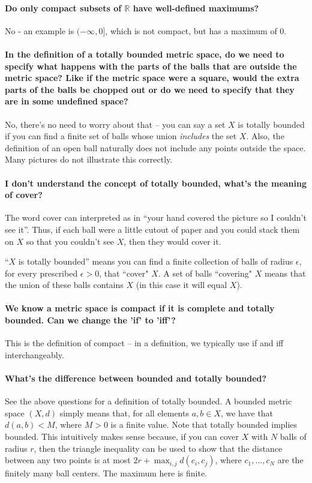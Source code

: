 \documentclass[10pt,english]{article}
\begin{document}
\paragraph{Do only compact subsets of $\mathbb{R}$ have well-defined maximums?}
No - an example is $(-\infty,0]$, which is not compact, but has a maximum of 0.


\paragraph{In the definition of a totally bounded metric space, do we need to specify what happens with the parts of the balls that are outside the metric space? Like if the metric space were a square, would the extra parts of the balls be chopped out or do we need to specify that they are in some undefined space?}

No, there's no need to worry about that -- you can say a set $X$ is totally bounded if you can find a finite set of balls whose union \textit{includes} the set $X$.
Also, the definition of an open ball naturally does not include any points outside the space.
Many pictures do not illustrate this correctly.


\paragraph{I don't understand the concept of totally bounded, what's the meaning of cover?}

The word cover can interpreted as in ``your hand covered the picture so I couldn't see it''.
Thus, if each ball were a little cutout of paper and you could stack them on $X$ so that you couldn't see $X$, then they would cover it.

``$X$ is totally bounded'' means you can find a finite collection of balls of radius $\epsilon$, for every prescribed $\epsilon>0$, that ``cover" $X$.
A set of balls ``covering" $X$ means that the union of these balls contains $X$ (in this case it will equal $X$).

\paragraph{We know a metric space is compact if it is complete and totally bounded. Can we change the 'if' to 'iff'?}
This is the definition of compact -- in a definition, we typically use if and iff interchangeably.


\paragraph{What's the difference between bounded and totally bounded?}
See the above questions for a definition of totally bounded.
A bounded metric space $(X,d)$ simply means that, for all elements $a,b \in X$, we have that $d(a,b)<M$, where $M>0$ is a finite value.
Note that totally bounded implies bounded.
This intuitively makes sense because, if you can cover $X$ with $N$ balls of radius $r$, then the triangle inequality can be used to show that the distance between any two points is at most $2r+\max_{i,j}d(c_i,c_j)$, where $c_1,\ldots,c_N$ are the finitely many ball centers. The maximum here is finite.
\end{document}
